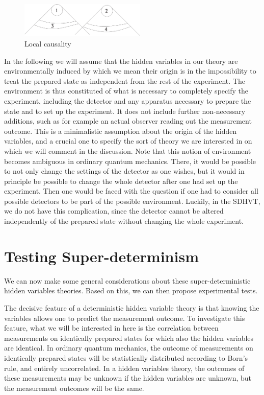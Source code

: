 \documentclass{svjour2}                    %
\begin{document}

\begin{figure} 
\hspace*{1.0cm}
\includegraphics[width=6cm]{1234.eps}
 
\caption{Local causality \label{fig1}}
\end{figure} 


In the following we will assume that the hidden variables in our theory are 
environmentally induced by which we mean their origin is in the impossibility
to treat the prepared state as independent from the rest of the experiment.
The environment is thus constituted of what is necessary to completely
specify the experiment, including the detector and any apparatus
necessary to prepare the state and to set up the experiment. It does not
include further non-necessary additions, such as for example an actual
observer reading out the measurement outcome. This is a minimalistic
assumption about the origin of the hidden variables, and a crucial one to
specify the sort of theory we are interested in on which
we will comment in the discussion. Note that this notion
of environment becomes ambiguous in ordinary quantum mechanics. There, it
would be possible to not only change the settings of the detector
as one wishes, but it would in principle be possible to change the whole
detector after one had set up the experiment. Then one would be faced
with the question if one had to consider all possible detectors to be
part of the possible environment. Luckily, in the {\sc SDHVT}, we do not
have this complication, since the detector cannot
be altered independently of the prepared state without changing
the whole experiment. 

\section{Testing Super-determinism}

We can now make some general considerations about these super-deterministic hidden variables
theories. Based on this, we can then propose experimental tests. 

The decisive feature of a deterministic hidden variable theory is that
knowing the variables allows one to predict the measurement outcome. To investigate
this feature, what we will
be interested in here is the correlation between measurements on identically
prepared states for which also the hidden variables are identical. In ordinary quantum mechanics, 
the outcome of measurements on 
identically prepared states will be statistically distributed according to Born's rule,
and entirely uncorrelated. In a hidden variables
theory, the outcomes of these measurements may be unknown if the hidden variables are unknown,
but the measurement outcomes will be the same. 
\end{document}
